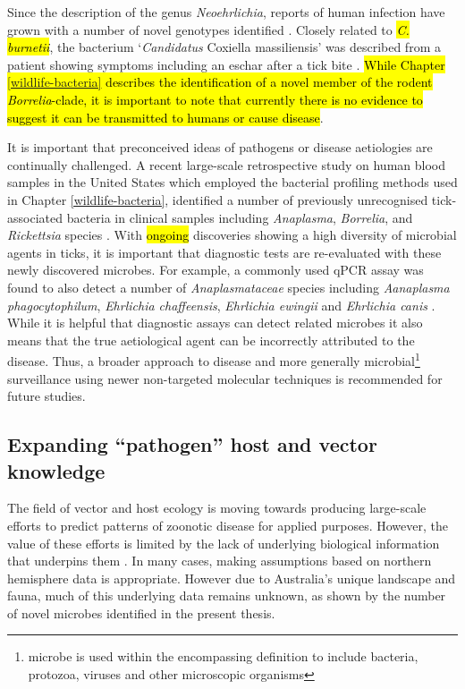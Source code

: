 \documentclass[a4paper, nobind]{templates/ociamthesis}
\begin{document}
Since the description of the genus \emph{Neoehrlichia}, reports of human infection have grown with a number of novel genotypes identified \autocite{wassCultivationCausativeAgent2019}.
Closely related to \hl{\emph{C. burnetii}}, the bacterium `\emph{Candidatus} Coxiella massiliensis' was described from a patient showing symptoms including an eschar after a tick bite \autocite{angelakisCandidatusCoxiellaMassiliensis2016}.
\hl{While Chapter \ref{wildlife-bacteria} describes the identification of a novel member of the rodent \emph{Borrelia}-clade, it is important to note that currently there is no evidence to suggest it can be transmitted to humans or cause disease}.

It is important that preconceived ideas of pathogens or disease aetiologies are continually challenged.
A recent large-scale retrospective study on human blood samples in the United States which employed the bacterial profiling methods used in Chapter \ref{wildlife-bacteria}, identified a number of previously unrecognised tick-associated bacteria in clinical samples including \emph{Anaplasma}, \emph{Borrelia}, and \emph{Rickettsia} species \autocite{kingryTargetedMetagenomicsClinical2020}.
With \hl{ongoing} discoveries showing a high diversity of microbial agents in ticks, it is important that diagnostic tests are re-evaluated with these newly discovered microbes.
For example, a commonly used qPCR assay was found to also detect a number of \emph{Anaplasmataceae} species including \emph{Aanaplasma phagocytophilum}, \emph{Ehrlichia chaffeensis}, \emph{Ehrlichia ewingii} and \emph{Ehrlichia canis} \autocite{murphyPrevalenceDistributionHuman2017}.
While it is helpful that diagnostic assays can detect related microbes it also means that the true aetiological agent can be incorrectly attributed to the disease.
Thus, a broader approach to disease and more generally microbial\footnote{microbe is used within the encompassing definition to include bacteria, protozoa, viruses and other microscopic organisms} surveillance using newer non-targeted molecular techniques is recommended for future studies.

\hypertarget{expanding-pathogen-host-and-vector-knowledge}{%
\subsection{Expanding ``pathogen'' host and vector knowledge}\label{expanding-pathogen-host-and-vector-knowledge}}

The field of vector and host ecology is moving towards producing large-scale efforts to predict patterns of zoonotic disease for applied purposes.
However, the value of these efforts is limited by the lack of underlying biological information that underpins them \autocite{alberyFastlivedHostsZoonotic2020}.
In many cases, making assumptions based on northern hemisphere data is appropriate.
However due to Australia's unique landscape and fauna, much of this underlying data remains unknown, as shown by the number of novel microbes identified in the present thesis.
\end{document}
